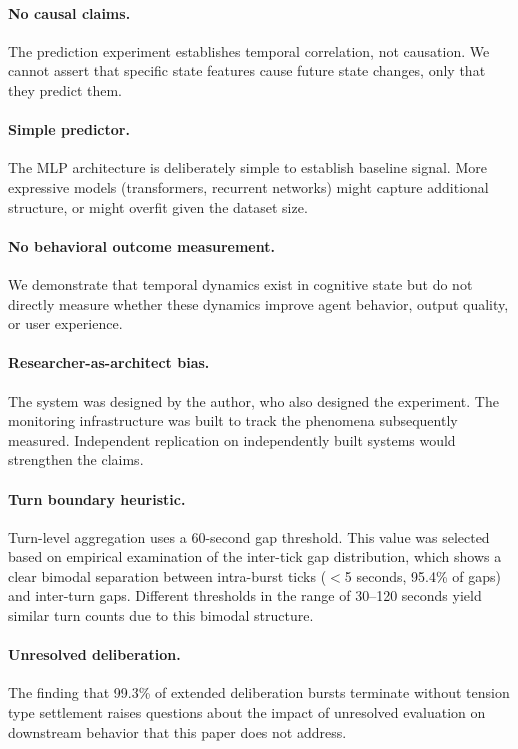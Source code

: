 \documentclass[twoside,11pt]{article}
\begin{document}
\paragraph{No causal claims.} The prediction experiment establishes temporal
correlation, not causation. We cannot assert that specific state features cause
future state changes, only that they predict them.

\paragraph{Simple predictor.} The MLP architecture is deliberately simple to
establish baseline signal. More expressive models (transformers, recurrent
networks) might capture additional structure, or might overfit given the dataset
size.

\paragraph{No behavioral outcome measurement.} We demonstrate that temporal
dynamics exist in cognitive state but do not directly measure whether these
dynamics improve agent behavior, output quality, or user experience.

\paragraph{Researcher-as-architect bias.} The system was designed by the author,
who also designed the experiment. The monitoring infrastructure was built to
track the phenomena subsequently measured. Independent replication on
independently built systems would strengthen the claims.

\paragraph{Turn boundary heuristic.} Turn-level aggregation uses a 60-second
gap threshold. This value was selected based on empirical examination of the
inter-tick gap distribution, which shows a clear bimodal separation between
intra-burst ticks ($<$5 seconds, 95.4\% of gaps) and inter-turn gaps. Different
thresholds in the range of 30--120 seconds yield similar turn counts due to
this bimodal structure.

\paragraph{Unresolved deliberation.} The finding that 99.3\% of extended
deliberation bursts terminate without tension type settlement raises questions
about the impact of unresolved evaluation on downstream behavior that this
paper does not address.
\end{document}
